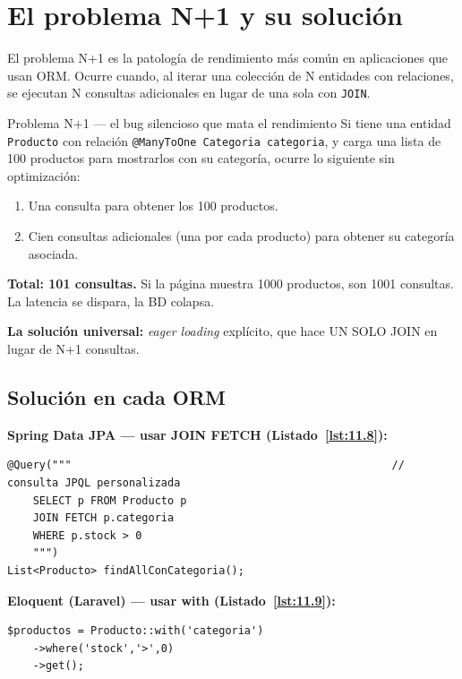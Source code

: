 \documentclass[11pt,a4paper,openany]{book}
\begin{document}
\section{El problema N+1 y su solución}

El problema N+1 es la patología de rendimiento más común en
aplicaciones que usan ORM. Ocurre cuando, al iterar una colección
de N entidades con relaciones, se ejecutan N consultas adicionales
en lugar de una sola con \texttt{JOIN}.


\begin{cajaadvertencia}{Problema N+1 --- el bug silencioso que mata el rendimiento}
Si tiene una entidad \texttt{Producto} con relación
\texttt{@ManyToOne Categoria categoria}, y carga una lista de 100
productos para mostrarlos con su categoría, ocurre lo siguiente sin
optimización:

\begin{enumerate}
\item Una consulta para obtener los 100 productos.
\item Cien consultas adicionales (una por cada producto) para
obtener su categoría asociada.
\end{enumerate}

\textbf{Total: 101 consultas.} Si la página muestra 1000 productos,
son 1001 consultas. La latencia se dispara, la BD colapsa.

\textbf{La solución universal:} \emph{eager loading} explícito, que
hace UN SOLO JOIN en lugar de N+1 consultas.
\end{cajaadvertencia}

\subsection{Solución en cada ORM}

\textbf{Spring Data JPA --- usar JOIN FETCH (Listado~\ref{lst:11.8}):}
\begin{lstlisting}[style=java,numbers=none,caption={Ejemplo de Java},label=lst:11.8]
@Query("""                                                  // consulta JPQL personalizada
    SELECT p FROM Producto p
    JOIN FETCH p.categoria
    WHERE p.stock > 0
    """)
List<Producto> findAllConCategoria();
\end{lstlisting}

\textbf{Eloquent (Laravel) --- usar with (Listado~\ref{lst:11.9}):}
\begin{lstlisting}[style=php,numbers=none,caption={Ejemplo de PHP},label=lst:11.9]
$productos = Producto::with('categoria')
    ->where('stock','>',0)
    ->get();
\end{lstlisting}
\end{document}
